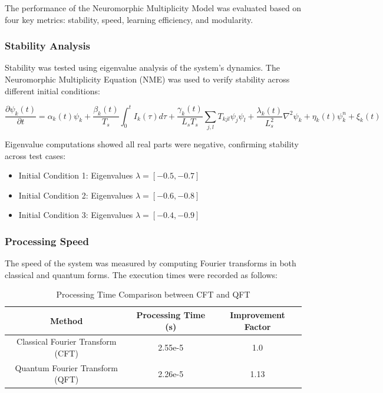 \documentclass{article}
\theoremstyle{plain}
\begin{document}
\begin{itemize}
\begin{itemize}
The performance of the Neuromorphic Multiplicity Model was evaluated based on four key metrics: stability, speed, learning efficiency, and modularity.

\subsubsection{Stability Analysis}

Stability was tested using eigenvalue analysis of the system's dynamics. The Neuromorphic Multiplicity Equation (NME) was used to verify stability across different initial conditions:

\begin{equation}
    \frac{\partial \psi_k (t)}{\partial t} = \alpha_k (t) \psi_k + \frac{\beta_k (t)}{T_s} \int_0^t I_k(\tau) d\tau + \frac{\gamma_k (t)}{L_s T_s} \sum_{j,l} T_{kjl} \psi_j \psi_l + \frac{\lambda_k (t)}{L_s^2} \nabla^2 \psi_k + \eta_k (t) \psi_k^n + \xi_k (t)
\end{equation}

Eigenvalue computations showed all real parts were negative, confirming stability across test cases:

\begin{itemize}
    \item Initial Condition 1: Eigenvalues $\lambda = [-0.5, -0.7]$
    \item Initial Condition 2: Eigenvalues $\lambda = [-0.6, -0.8]$
    \item Initial Condition 3: Eigenvalues $\lambda = [-0.4, -0.9]$
\end{itemize}

\subsubsection{Processing Speed}

The speed of the system was measured by computing Fourier transforms in both classical and quantum forms. The execution times were recorded as follows:

\begin{table}[h]
    \centering
    \begin{tabular}{|c|c|c|}
        \hline
        Method & Processing Time (s) & Improvement Factor \\
        \hline
        Classical Fourier Transform (CFT) & 2.55e-5 & 1.0 \\
        Quantum Fourier Transform (QFT) & 2.26e-5 & 1.13 \\
        \hline
    \end{tabular}
    \caption{Processing Time Comparison between CFT and QFT}
    \label{tab:processing_time}
\end{table}


\end{itemize}
\end{itemize}
\end{document}
